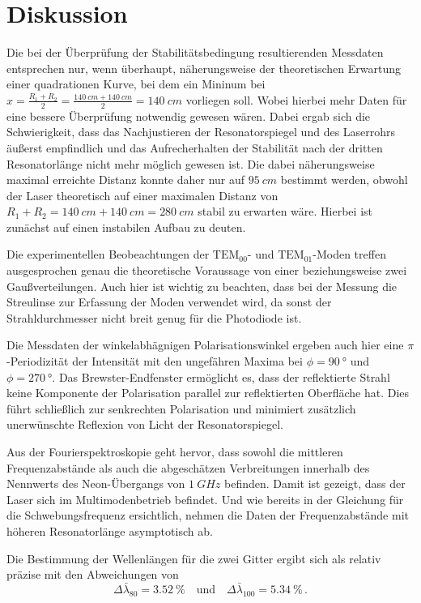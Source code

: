 \section{Diskussion}
\label{sec:Diskussion}

Die bei der Überprüfung der Stabilitätsbedingung resultierenden Messdaten entsprechen nur, wenn überhaupt,
näherungsweise der theoretischen Erwartung
einer quadrationen Kurve, bei dem ein Mininum bei 
$ x = \frac{R_1 + R_2}{2} = \frac{\qty{140}{cm} + \qty{140}{cm}}{2} = \qty{140}{cm}$ vorliegen soll.
Wobei hierbei mehr Daten für eine bessere Überprüfung notwendig gewesen wären.
Dabei ergab sich die Schwierigkeit, 
dass das Nachjustieren der Resonatorspiegel und des Laserrohrs äußerst empfindlich
und das Aufrecherhalten der Stabilität nach der dritten Resonatorlänge nicht mehr möglich gewesen ist.
Die dabei näherungsweise maximal erreichte Distanz konnte daher nur auf $\qty{95}{cm}$ bestimmt werden, 
obwohl der Laser theoretisch auf einer maximalen Distanz von $R_1 + R_2 =  \qty{140}{cm} + \qty{140}{cm} = \qty{280}{cm}$ stabil zu erwarten wäre. 
Hierbei ist zunächst auf einen instabilen Aufbau zu deuten. 

Die experimentellen Beobeachtungen der $\text{TEM}_{00}$- und $\text{TEM}_{01}$-Moden treffen ausgesprochen genau die
theoretische Voraussage von einer beziehungsweise zwei Gaußverteilungen. 
Auch hier ist wichtig zu beachten, dass bei der Messung die Streulinse zur Erfassung der Moden verwendet wird,
da sonst der Strahldurchmesser nicht breit genug für die Photodiode ist.

Die Messdaten der winkelabhägnigen Polarisationswinkel ergeben auch hier eine $\pi$-Periodizität der Intensität
mit den ungefähren Maxima bei $\phi = \qty{90}{\degree}$ und $\phi = \qty{270}{\degree}$.
Das Brewster-Endfenster ermöglicht es, dass der reflektierte Strahl keine Komponente der Polarisation parallel zur reflektierten Oberfläche hat.
Dies führt schließlich zur senkrechten Polarisation und minimiert zusätzlich unerwünschte Reflexion von Licht der Resonatorspiegel.

Aus der Fourierspektroskopie geht hervor, 
dass sowohl die mittleren Frequenzabstände
als auch die abgeschätzen Verbreitungen innerhalb des Nennwerts des Neon-Übergangs von $\qty{1}{GHz}$ befinden.
Damit ist gezeigt, dass der Laser sich im Multimodenbetrieb befindet.
Und wie bereits in der Gleichung für die Schwebungsfrequenz ersichtlich, 
nehmen die Daten der Frequenzabstände mit höheren Resonatorlänge asymptotisch ab.

Die Bestimmung der Wellenlängen für die zwei Gitter ergibt sich als relativ präzise mit den Abweichungen von
\begin{equation*}
    \Delta \bar{\lambda}_{80} = \qty{3.52}{\percent} \quad \text{und} \quad 
    \Delta \bar{\lambda}_{100} = \qty{5.34}{\percent} \, .
\end{equation*}